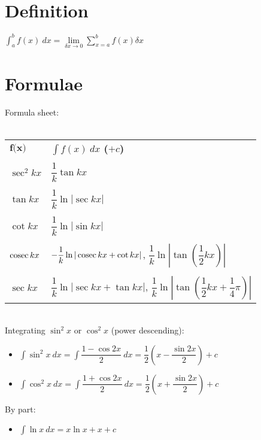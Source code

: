 \section{Definition}
$\int_{a}^{b} f(x) \: dx = \lim\limits_{\delta x\rightarrow0}\sum_{x=a}^{b}f(x)\delta x$

\section{Formulae}
Formula sheet:\\\\
\begin{tabular}{ll}
    $\textbf{f(x)}$ & \textbf{$\int f(x) \: dx$ ($+c$)}                                                                             \\&\\
    $\sec^2kx$      & $\dfrac{1}{k} \tan kx$                                                                                        \\&\\
    $\tan kx$       & $\dfrac{1}{k} \ln |\sec kx|$                                                                                  \\&\\
    $\cot kx$       & $\dfrac{1}{k} \ln |\sin kx|$                                                                                  \\&\\
    $\operatorname{cosec} kx$     & $-\dfrac{1}{k} \ln |\operatorname{cosec} kx + \cot kx|$, $\dfrac{1}{k} \ln \left|\tan (\dfrac{1}{2}kx)\right|$              \\&\\
    $\sec kx$       & $\dfrac{1}{k} \ln |\sec kx + \tan kx|$, $\dfrac{1}{k} \ln \left|\tan (\dfrac{1}{2}kx+\dfrac{1}{4}\pi)\right|$ \\
\end{tabular}\\
Integrating $\sin^2x$ or $\cos^2x$ (power descending):
\begin{itemize}
    \item $\int \sin ^2 x \: dx=\int \dfrac{1-\cos 2x}{2} \: dx=\dfrac{1}{2}\left(x-\dfrac{\sin 2x}{2}\right)+c$
    \item $\int \cos ^2 x \: dx=\int \dfrac{1+\cos 2x}{2} \: dx= \dfrac{1}{2}\left(x+\dfrac{\sin 2x}{2}\right)+c$
\end{itemize}
By part:
\begin{itemize}
    \item $\int \ln x \: dx = x\ln x + x + c$
\end{itemize}
